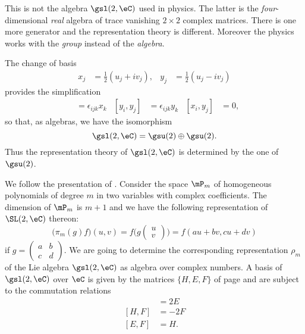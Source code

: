 \begin{remark}
    This is not the algebra \( \gsl(2,\eC)\) used in physics. The latter is the \emph{four}-dimensional \emph{real} algebra of trace vanishing \( 2\times 2\) complex matrices. There is one more generator and the representation theory is different. Moreover the physics works with the \emph{group} instead of the \emph{algebra}.
\end{remark}

The change of basis
\begin{align}
	x_j&=\frac{ 1 }{2}(u_j+iv_j),	&y_j&=\frac{ 1 }{2}(u_j-iv_j)
\end{align}
provides the simplification
\begin{align}
[x_i,x_j]&=\epsilon_{ijk}x_k	&[y_i,y_j]&=\epsilon_{ijk}y_k	&[x_i,y_j]&=0,
\end{align}
so that, as algebras, we have the isomorphism
\begin{equation}
	\gsl(2,\eC)=\gsu(2)\oplus\gsu(2).
\end{equation}
Thus the representation theory of $\gsl(2,\eC)$ is determined by the one of $\gsu(2)$.


We follow the presentation of \cite{GpAlgLie_Faraut}. Consider the space $\mP_m$ of homogeneous polynomials of degree $m$ in two variables with complex coefficients. The dimension of $\mP_m$ is $m+1$ and we have the following representation of $\SL(2,\eC)$ thereon:
\begin{equation}
	\big( \pi_m(g)f \big)(u,v)=f\big( 
g
\begin{pmatrix}
u\\v
\end{pmatrix}
 \big)
=
f(au+bv,cu+dv)
\end{equation}
if $g=\begin{pmatrix}
  a	&	b	\\ 
  c	&	d	
\end{pmatrix}$. We are going to determine the corresponding representation $\rho_m$ of the Lie algebra $\gsl(2,\eC)$ as algebra over complex numbers. A basis of $\gsl(2,\eC)$ over $\eC$ is given by the matrices $\{ H,E,F \}$ of page \pageref{PgBaseSLdeuxRHEF} and are subject to the commutation relations
\begin{align}
[H,E]&=2E\\
[H,F]&=-2F\\
[E,F]&=H.
\end{align}

